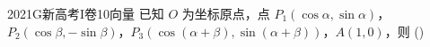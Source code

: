 
\begin{problem}{2021}{G}{新高考I卷}{10}{向量}
已知 $ O $ 为坐标原点，点 $ P_1(\cos\alpha,\sin\alpha) $，$ P_2(\cos\beta,-\sin\beta) $，$ P_3(\cos(\alpha+\beta),\sin(\alpha+\beta)) $，$ A(1,0) $，则 (\hspace{1cm})
\end{problem}

\begin{choices}
\end{choices}